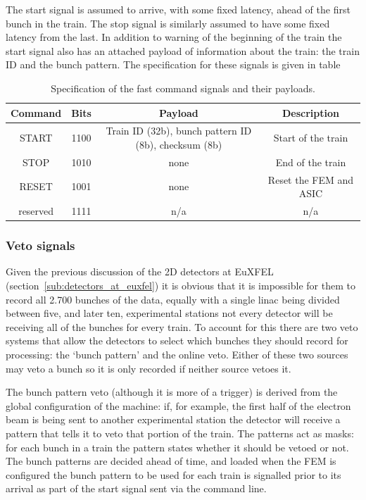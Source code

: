 The start signal is assumed to arrive, with some fixed latency, ahead of the first bunch in the train. The stop signal is similarly assumed to have some fixed latency from the last. In addition to warning of the beginning of the train the start signal also has an attached payload of information about the train: the train ID and the bunch pattern. The specification for these signals is given in table
\begin{table}
  \begin{center}
  \begin{tabular}{c | c | c | c}
    Command  & Bits & Payload & Description \\
    \hline   
    START    & 1100 & Train ID (32b), bunch pattern ID (8b), checksum (8b) & Start of the train \\
    STOP     & 1010 & none                                                 & End of the train \\
    RESET    & 1001 & none                                                 & Reset the FEM and ASIC \\
    reserved & 1111 & n/a                                                  & n/a\\
  \end{tabular}
  \end{center}
  \caption{Specification of the fast command signals and their payloads.}
  \label{tab:fast_commands}
\end{table}
\subsubsection{Veto signals} %
\label{sub:veto_signal}
Given the previous discussion of the 2D detectors at EuXFEL (section~\ref{sub:detectors_at_euxfel}) it is obvious that it is impossible for them to record all 2.700 bunches of the data, equally with a single linac being divided between five, and later ten, experimental stations not every detector will be receiving all of the bunches for every train. To account for this there are two veto systems that allow the detectors to select which bunches they should record for processing: the `bunch pattern' and the online veto. Either of these two sources may veto a bunch so it is only recorded if neither source vetoes it. 

The bunch pattern veto (although it is more of a trigger) is derived from the global configuration of the machine: if, for example, the first half of the electron beam is being sent to another experimental station the detector will receive a pattern that tells it to veto that portion of the train. The patterns act as masks: for each bunch in a train the pattern states whether it should be vetoed or not. The bunch patterns are decided ahead of time, and loaded when the FEM is configured the bunch pattern to be used for each train is signalled prior to its arrival as part of the start signal sent via the command line.


